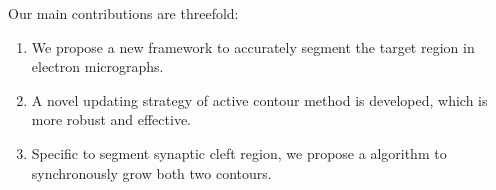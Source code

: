 Our main contributions are threefold:
\begin{enumerate}
	\item We propose a new framework to accurately segment the target region in electron micrographs.
	\item A novel updating strategy of active contour method is developed, which is more robust and effective.
	\item Specific to segment synaptic cleft region, we propose a algorithm to synchronously grow both two contours.
\end{enumerate}
